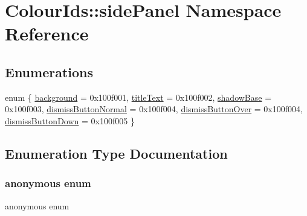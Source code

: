 \hypertarget{namespaceColourIds_1_1sidePanel}{}\section{Colour\+Ids\+:\+:side\+Panel Namespace Reference}
\label{namespaceColourIds_1_1sidePanel}
\subsection*{Enumerations}
\begin{DoxyCompactItemize}
\item 
enum \{ \newline
\mbox{\hyperlink{namespaceColourIds_1_1sidePanel_a1306f2c922f942a1e43799953c756c67a2bff80aa5885a4612e6caa6d9387d067}{background}} = 0x100f001, 
\mbox{\hyperlink{namespaceColourIds_1_1sidePanel_a1306f2c922f942a1e43799953c756c67a83e88850546c4f216a6be432dc413611}{title\+Text}} = 0x100f002, 
\mbox{\hyperlink{namespaceColourIds_1_1sidePanel_a1306f2c922f942a1e43799953c756c67a13b695cb70e04f6b31f06e848b765f6c}{shadow\+Base}} = 0x100f003, 
\mbox{\hyperlink{namespaceColourIds_1_1sidePanel_a1306f2c922f942a1e43799953c756c67a8de596147bcda1a083ebb8cf8d450ffa}{dismiss\+Button\+Normal}} = 0x100f004, 
\newline
\mbox{\hyperlink{namespaceColourIds_1_1sidePanel_a1306f2c922f942a1e43799953c756c67a75e369d3a647cd5f2a6989aab3f1812a}{dismiss\+Button\+Over}} = 0x100f004, 
\mbox{\hyperlink{namespaceColourIds_1_1sidePanel_a1306f2c922f942a1e43799953c756c67a59ad7bc64b48cd41f52bfcaecefedb83}{dismiss\+Button\+Down}} = 0x100f005
 \}
\end{DoxyCompactItemize}


\subsection{Enumeration Type Documentation}
\mbox{\label{namespaceColourIds_1_1sidePanel_a1306f2c922f942a1e43799953c756c67}} 
\subsubsection{\texorpdfstring{anonymous enum}{anonymous enum}}
{\footnotesize\ttfamily anonymous enum}

